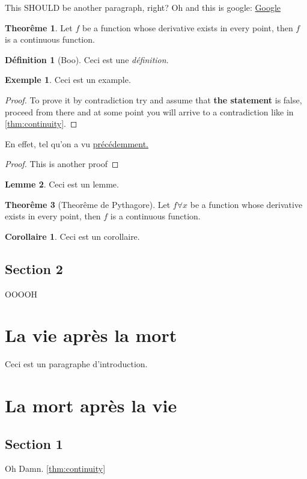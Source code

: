 \documentclass[12pt]{book}
\def\sep{\phantom{}}
\theoremstyle{definition}
\newtheorem{definition}{Définition}[section]
\newtheorem*{example}{Exemple}
\newtheorem{theorem}{Theorême}[section]
\newtheorem{corollary}{Corollaire}[theorem]
\newtheorem{lemma}[theorem]{Lemme}
\begin{document}
This SHOULD be another paragraph, right? Oh and this is google: \href{http://google.com}{Google}
\begin{theorem}
    \label{thm:continuity}
    Let $f$ be a function whose derivative exists    in every point,
    then $f$ is a continuous function.
\end{theorem}
\begin{definition}[Boo]
    Ceci est une \textit{définition}.
\end{definition}
\begin{example}
    Ceci est un example.
\end{example}
\begin{proof}
    To prove it by contradiction try and assume that \textbf{the statement} is false, \sep
    proceed from there and at some point you will arrive to a contradiction like in \autoref{thm:continuity}.
\end{proof}
\begin{comment}
    This is a comment, \sep
    a multi-line comment,
\end{comment}
En effet, tel qu'on a vu \hyperref[thm:continuity]{précédemment.}
\begin{proof}
    This is another proof
\end{proof}
\begin{comment}
    This is a comment.
\end{comment}
\begin{lemma}
    Ceci est un lemme.
\end{lemma}
\begin{theorem}[Theorême de Pythagore]
    Let $f \forall x$ be a function whose derivative exists in every point,
    then $f$ is a continuous function. 
\end{theorem}
\begin{corollary}
    Ceci est un corollaire.
\end{corollary}
\section{Section 2}
OOOOH

\chapter{La vie après la mort}
Ceci est un paragraphe d'introduction.
\chapter{La mort après la vie}
\section{Section 1}
Oh Damn. \autoref{thm:continuity}
\end{document}
